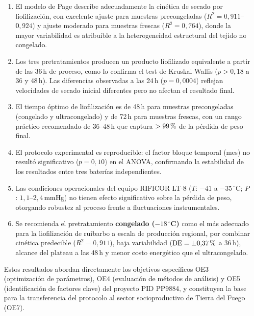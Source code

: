 \documentclass[12pt, a4paper]{article}
\newcommand{\pct}{\char`\%}
\begin{document}
\begin{enumerate}
    \item El modelo de Page describe adecuadamente la cinética de secado por liofilización, con excelente ajuste para muestras precongeladas ($R^2 = 0{,}911$--$0{,}924$) y ajuste moderado para muestras frescas ($R^2 = 0{,}764$), donde la mayor variabilidad es atribuible a la heterogeneidad estructural del tejido no congelado.

    \item Los tres pretratamientos producen un producto liofilizado equivalente a partir de las 36\,h de proceso, como lo confirma el test de Kruskal-Wallis ($p > 0{,}18$ a 36 y 48\,h). Las diferencias observadas a las 24\,h ($p = 0{,}0004$) reflejan velocidades de secado inicial diferentes pero no afectan el resultado final.

    \item El tiempo óptimo de liofilización es de 48\,h para muestras precongeladas (congelado y ultracongelado) y de 72\,h para muestras frescas, con un rango práctico recomendado de 36--48\,h que captura $>99\,\pct{}$ de la pérdida de peso final.

    \item El protocolo experimental es reproducible: el factor bloque temporal (mes) no resultó significativo ($p = 0{,}10$) en el ANOVA, confirmando la estabilidad de los resultados entre tres baterías independientes.

    \item Las condiciones operacionales del equipo RIFICOR LT-8 ($T$: $-41$ a $-35\,^\circ$C; $P$: $1{,}1$--$2{,}4$\,mmHg) no tienen efecto significativo sobre la pérdida de peso, otorgando robustez al proceso frente a fluctuaciones instrumentales.

    \item Se recomienda el pretratamiento \textbf{congelado ($-18\,^\circ$C)} como el más adecuado para la liofilización de ruibarbo a escala de producción regional, por combinar cinética predecible ($R^2 = 0{,}911$), baja variabilidad ($\text{DE} = \pm 0{,}37\,\pct{}$ a 36\,h), alcance del plateau a las 48\,h y menor costo energético que el ultracongelado.
\end{enumerate}

Estos resultados abordan directamente los objetivos específicos OE3 (optimización de parámetros), OE4 (evaluación de métodos de análisis) y OE5 (identificación de factores clave) del proyecto PID PP9884, y constituyen la base para la transferencia del protocolo al sector socioproductivo de Tierra del Fuego (OE7).
\end{document}
